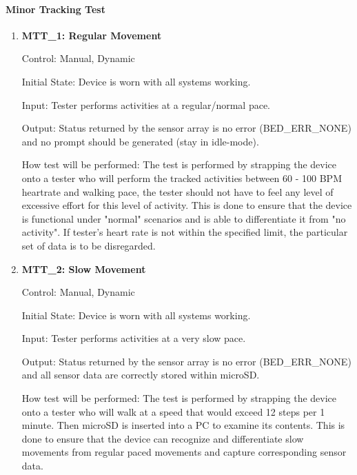 \documentclass[12pt, titlepage]{article}
\begin{document}
\paragraph{Minor Tracking Test}
\begin{enumerate}
	\item{\textbf{MTT\_1: Regular Movement} \\}\label{MTT1}
	
		Control: Manual, Dynamic
							
		Initial State: Device is worn with all systems working.
							
		Input: Tester performs activities at a regular/normal pace.
		
		Output: Status returned by the sensor array is no error (BED\_ERR\_NONE) and no prompt should be generated (stay in idle-mode).

		How test will be performed: The test is performed by strapping the device onto a tester who will perform the tracked activities between 60 - 100 BPM heartrate and walking pace, the tester should not have to feel any level of excessive effort for this level of activity. This is done to ensure that the device is functional under "normal" scenarios and is able to differentiate it from "no activity". If tester's heart rate is not within the specified limit, the particular set of data is to be disregarded.

	\item{\textbf{MTT\_2: Slow Movement} \\}\label{MTT2}
	
		Control: Manual, Dynamic
							
		Initial State: Device is worn with all systems working.
							
		Input: Tester performs activities at a very slow pace.
		
		Output: Status returned by the sensor array is no error (BED\_ERR\_NONE) and all sensor data are correctly stored within microSD.
		
		How test will be performed: The test is performed by strapping the device onto a tester who will walk at a speed that would exceed 12 steps per 1 minute. Then microSD is inserted into a PC to examine its contents. This is done to ensure that the device can recognize and differentiate slow movements from regular paced movements and capture corresponding sensor data.\\


\end{enumerate}
\end{document}
